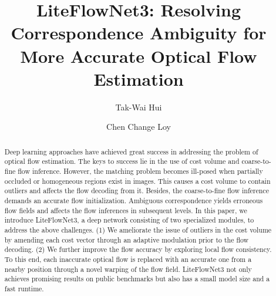 \documentclass[runningheads]{llncs}
\begin{document}
\pagestyle{headings}
\mainmatter
\def\ECCVSubNumber{3400}  

\title{LiteFlowNet3: Resolving Correspondence Ambiguity for More Accurate Optical Flow Estimation} 

\begin{comment}
\titlerunning{ECCV-20 submission ID \ECCVSubNumber} 
\authorrunning{ECCV-20 submission ID \ECCVSubNumber} 
\author{Anonymous ECCV submission}
\institute{Paper ID \ECCVSubNumber}
\end{comment}


\author{Tak-Wai Hui \and
Chen Change Loy}
\maketitle

\begin{abstract}
Deep learning approaches have achieved great success in addressing the problem of optical flow estimation. 
The keys to success lie in the use of cost volume and coarse-to-fine flow inference. 
However, the matching problem becomes ill-posed when partially occluded or homogeneous regions exist in images. 
This causes a cost volume to contain outliers and affects the flow decoding from it. 
Besides, the coarse-to-fine flow inference demands an accurate flow initialization. Ambiguous correspondence yields erroneous flow fields and affects the flow inferences in subsequent levels.
In this paper, we introduce LiteFlowNet3, a deep network consisting of two specialized modules, to address the above challenges.
(1) We ameliorate the issue of outliers in the cost volume by amending each cost vector through an adaptive modulation prior to the flow decoding. 
(2) We further improve the flow accuracy by exploring local flow consistency. To this end, each inaccurate optical flow is replaced with an accurate one from a nearby position through a novel warping of the flow field. 
LiteFlowNet3 not only achieves promising results on public benchmarks but also has a small model size and a fast runtime.

\end{abstract}
\end{document}
